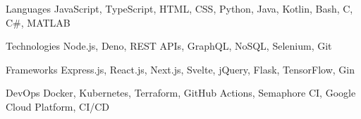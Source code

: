 

\begin{cvskills}

  \cvskill
    {Languages} %
    {JavaScript, TypeScript, HTML, CSS, Python, Java, Kotlin, Bash, C, C\#, MATLAB } %

  \cvskill
    {Technologies} %
    {Node.js, Deno, REST APIs, GraphQL, NoSQL, Selenium, Git} %

  \cvskill
    {Frameworks} %
    {Express.js, React.js, Next.js, Svelte, jQuery, Flask, TensorFlow, Gin} %

  \cvskill
    {DevOps} %
    {Docker, Kubernetes, Terraform, GitHub Actions, Semaphore CI, Google Cloud Platform, CI/CD} %

\end{cvskills}
